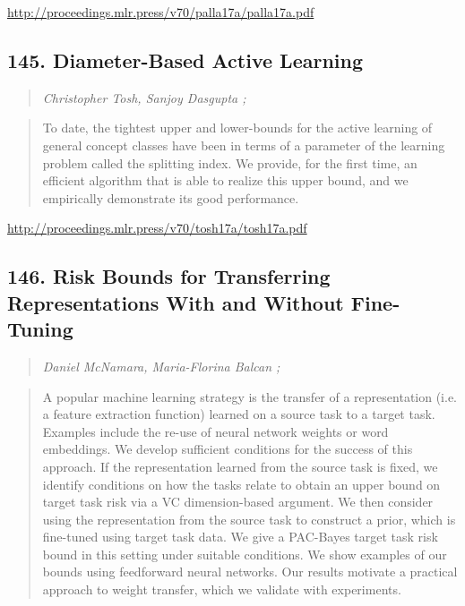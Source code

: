 \documentclass{article}
\begin{document}
\href{http://proceedings.mlr.press/v70/palla17a/palla17a.pdf}{http://proceedings.mlr.press/v70/palla17a/palla17a.pdf}

\subsection{145. Diameter-Based Active Learning}

\begin{quote}
\footnotesize{\textit{Christopher Tosh, Sanjoy Dasgupta ;}}

\end{quote}

\begin{quote}
    To date, the tightest upper and lower-bounds for the active learning of general concept classes have been in terms of a parameter of the learning problem called the splitting index. We provide, for the first time, an efficient algorithm that is able to realize this upper bound, and we empirically demonstrate its good performance.  
\end{quote}

\href{http://proceedings.mlr.press/v70/tosh17a/tosh17a.pdf}{http://proceedings.mlr.press/v70/tosh17a/tosh17a.pdf}

\subsection{146. Risk Bounds for Transferring Representations With and Without Fine-Tuning}

\begin{quote}
\footnotesize{\textit{Daniel McNamara, Maria-Florina Balcan ;}}

\end{quote}

\begin{quote}
    A popular machine learning strategy is the transfer of a representation (i.e. a feature extraction function) learned on a source task to a target task. Examples include the re-use of neural network weights or word embeddings. We develop sufficient conditions for the success of this approach. If the representation learned from the source task is fixed, we identify conditions on how the tasks relate to obtain an upper bound on target task risk via a VC dimension-based argument. We then consider using the representation from the source task to construct a prior, which is fine-tuned using target task data. We give a PAC-Bayes target task risk bound in this setting under suitable conditions. We show examples of our bounds using feedforward neural networks. Our results motivate a practical approach to weight transfer, which we validate with experiments.  
\end{quote}
\end{document}
